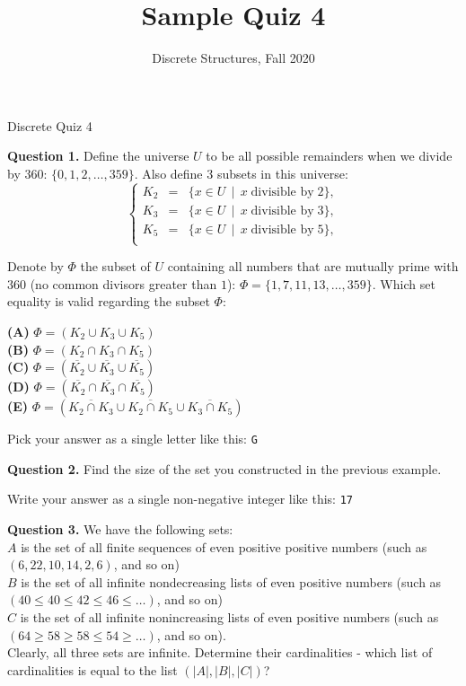 \documentclass[jou]{apa6}
\title{Sample Quiz 4}
\author{Discrete Structures, Fall 2020}
\affiliation{RBS}
\begin{document}
\thispagestyle{empty}

\twocolumn
{\Large Discrete Quiz 4}

\vspace{10pt}
{\bf Question 1.} Define the universe $U$ to be all possible remainders 
when we divide by $360$: $\{ 0, 1, 2, \ldots, 359 \}$. 
Also define $3$ subsets in this universe: 
$$\left\{ \begin{array}{rcl}
K_2 & = & \{ x \in U \,\mid\, x\;\text{divisible by}\;2 \},\\
K_3 & = & \{ x \in U \,\mid\, x\;\text{divisible by}\;3 \},\\
K_5 & = & \{ x \in U \,\mid\, x\;\text{divisible by}\;5 \},\\
\end{array} \right.$$

Denote by $\Phi$ the subset of $U$ containing all numbers
that are mutually prime with $360$ (no common divisors greater than $1$):
$\Phi = \{1,7,11,13,\ldots,359\}$.
Which set equality is valid regarding the subset $\Phi$:

\noindent
{\bf (A)} $\Phi = \left( K_2 \cup K_3 \cup K_5 \right)$\\
{\bf (B)} $\Phi = \left( K_2 \cap K_3 \cap K_5 \right)$\\
{\bf (C)} $\Phi = \left( \overline{K_2} \cup \overline{K_3} \cup \overline{K_5} \right)$\\
{\bf (D)} $\Phi = \left( \overline{K_2} \cap \overline{K_3} \cap \overline{K_5} \right)$\\
{\bf (E)} $\Phi = \left( \overline{K_2 \cap K_3} \cup \overline{K_2 \cap K_5} \cup \overline{K_3 \cap K_5} \right)$


Pick your answer as a single letter like this: {\tt G}

\vspace{6pt}
{\bf Question 2.}
Find the size of the set you constructed in the previous example. 

Write your answer as a single non-negative integer like this: {\tt 17}


\vspace{6pt}
{\bf Question 3.} We have the following sets:\\
$A$ is the set of all finite sequences of even positive positive numbers (such as $(6,22,10,14,2,6)$, and so on)\\
$B$ is the set of all infinite nondecreasing lists of even positive numbers (such as $(40 \leq 40 \leq 42 \leq 46 \leq \ldots)$, and so on)\\
$C$ is the set of all infinite nonincreasing lists of even positive numbers (such as $(64 \geq 58 \geq 58 \leq 54 \geq \ldots)$, and so on).\\
Clearly, all three sets are infinite. Determine their cardinalities - which list 
of cardinalities is equal to the list  $(|A|,|B|,|C|)$?
\end{document}
